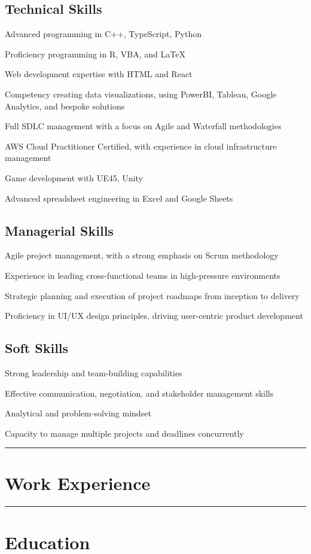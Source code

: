 \documentclass[10pt]{article}
\let\tempone\itemize
\let\temptwo\enditemize
\renewenvironment{itemize}{\tempone\addtolength{\itemsep}{-0.5\baselineskip}}{\temptwo}
\newcommand{\hr}{%
	\noindent\rule{\textwidth}{1pt}
	\vspace{-15pt}
}
\begin{document}
	\subsection*{Technical Skills}
	\begin{itemize}
		\item Advanced programming in C++, TypeScript, Python
		\item Proficiency programming in R, VBA, and LaTeX
		\item Web development expertise with HTML and React
		\item Competency creating data visualizations, using PowerBI, Tableau, Google Analytics, and bespoke solutions
		\item Full SDLC management with a focus on Agile and Waterfall methodologies
		\item AWS Cloud Practitioner Certified, with experience in cloud infrastructure management
		\item Game development with \gls{UE45}, \gls{Unity}
		\item Advanced spreadsheet engineering in Excel and Google Sheets
	\end{itemize}

	\subsection*{Managerial Skills}
	\begin{itemize}
		\item Agile project management, with a strong emphasis on Scrum methodology
		\item Experience in leading cross-functional teams in high-pressure environments
		\item Strategic planning and execution of project roadmaps from inception to delivery
		\item Proficiency in UI/UX design principles, driving user-centric product development
	\end{itemize}

	\subsection*{Soft Skills}
	\begin{itemize}
		\item Strong leadership and team-building capabilities
		\item Effective communication, negotiation, and stakeholder management skills
		\item Analytical and problem-solving mindset
		\item Capacity to manage multiple projects and deadlines concurrently
	\end{itemize}

	\hr{}

	\section*{Work Experience}
	\workexperience{}

	\hr{}
	
	\section*{Education}
	\education{}
\end{document}
